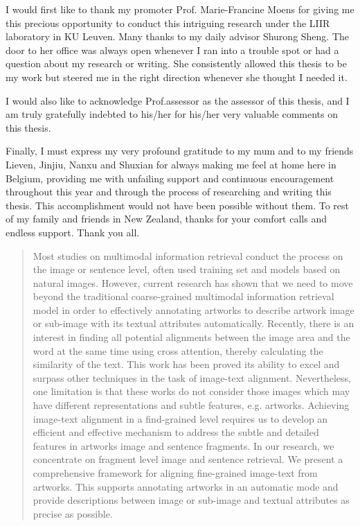\documentclass[master=mai,masteroption=bda]{kulemt}
\begin{document}
\begin{preface}
I would first like to thank my promoter Prof. Marie-Francine Moens for giving me this precious opportunity to conduct this intriguing research under the LIIR laboratory in KU Leuven. Many thanks to my daily advisor Shurong Sheng. The door to her office was always open whenever I ran into a trouble spot or had a question about my research or writing. She consistently allowed this thesis to be my work but steered me in the right direction whenever she thought I needed it.

I would also like to acknowledge Prof.assessor as the assessor of this thesis, and I am truly gratefully indebted to his/her for his/her very valuable comments on this thesis.

Finally, I must express my very profound gratitude to my mum and to my friends Lieven, Jinjiu, Nanxu and Shuxian for always making me feel at home here in Belgium, providing me with unfailing support and continuous encouragement throughout this year and through the process of researching and writing this thesis. This accomplishment would not have been possible without them. To rest of my family and friends in New Zealand, thanks for your comfort calls and endless support. Thank you all.

\end{preface}

\tableofcontents*

\begin{abstract}
Most studies on multimodal information retrieval conduct the process on the image or sentence level, often used training set and models based on natural images. However, current research has shown that we need to move beyond the traditional coarse-grained multimodal information retrieval model in order to effectively annotating artworks to describe artwork image or sub-image with its textual attributes automatically. Recently, there is an interest in finding all potential alignments between the image area and the word at the same time using cross attention, thereby calculating the similarity of the text. This work has been proved its ability to excel and surpass other techniques in the task of image-text alignment. Nevertheless, one limitation is that these works do not consider those images which may have different representations and subtle features, e.g. artworks. Achieving image-text alignment in a find-grained level requires us to develop an efficient and effective mechanism to address the subtle and detailed features in artworks image and sentence fragments. In our research, we concentrate on fragment level image and sentence retrieval. We present a comprehensive framework for aligning fine-grained image-text from artworks. This supports annotating artworks in an automatic mode and provide descriptions between image or sub-image and textual attributes as precise as possible.

\end{abstract}
\end{document}
